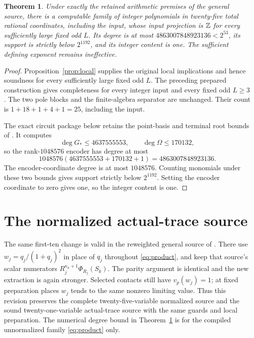 \documentclass[11pt,a4paper]{article}
\newtheorem{theorem}[lemma]{Theorem}
\begin{document}
\begin{theorem}\label{thm:complete}
Under exactly the retained arithmetic premises of the general
source, there is a computable family of integer polynomials in
twenty-five total rational coordinates, including the input, whose
input projection is $\mathbb Z$ for every sufficiently large fixed odd
$L$. Its degree is at most $4863007848923136<2^{53}$, its support
is strictly below $2^{1192}$, and its integer content is one.
The sufficient defining exponent remains ineffective.
\end{theorem}
\begin{proof}
Proposition~\ref{prop:local} supplies the original local
implications and hence soundness for every sufficiently large fixed
odd $L$. The preceding prepared construction gives completeness for
every integer input and every fixed odd $L\ge3$. The two pole blocks
and the finite-algebra separator are unchanged. Their count is
$1+18+1+4+1=25$, including the input.

The exact circuit package below retains the point-basis and terminal
root bounds of \cite{FullAux}. It computes
\[
 \deg G_*\le4637555553,\qquad \deg\Omega\le170132,
\]
so the rank-$1048576$ encoder has degree at most
\[
 1048576(4637555553+170132+1)=4863007848923136.
\]
The encoder-coordinate degree is at most $1048576$. Counting
monomials under these two bounds gives support strictly below
$2^{1192}$. Setting the encoder coordinate to zero gives one,
so the integer content is one.
\end{proof}

\section{The normalized actual-trace source}

The same first-ten change is valid in the reweighted general source
of \cite{Reweighted}. There use $w_j=q_j/(1+q_j)^2$ in place
of $q_j$ throughout \eqref{eq:product}, and keep that source's
scalar numerators $R_j^{\kappa_k+1}\Phi_{R_j}(S_k)$.
The parity argument is identical and the new extraction is again
stronger. Selected contacts still have $v_p(w_j)=1$; at fixed
preparation places $w_j$ tends to the same nonzero limiting value.
Thus this revision preserves the complete twenty-five-variable
normalized source and the sound twenty-one-variable actual-trace
source with the same guards and local preparation. The numerical
degree bound in Theorem~\ref{thm:complete} is for the compiled
unnormalized family \eqref{eq:product} only.
\end{document}
